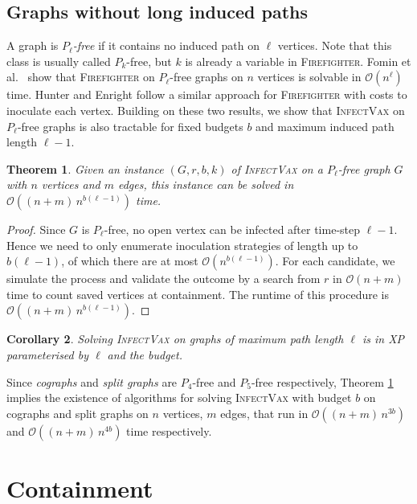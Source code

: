 \documentclass[unknownkeysallowed]{article}
\newtheorem{theorem}{Theorem}[section]
\newtheorem{corollary}[theorem]{Corollary}
\theoremstyle{definition}\newtheorem{strategy}{Strategy}
\theoremstyle{definition}\newtheorem{notation}{Notation}[theorem]
\newcommand*{\Fire}{\textup{\textsc{Firefighter}}\xspace} %
\newcommand*{\IV}{\textup{\textsc{InfectVax}}\xspace}
\begin{document}
\subsection{Graphs without long induced paths}
\label{sec:bounded-path-length}

A graph is \emph{$P_\ell$-free} if it contains no induced path on $\ell$ vertices.  Note that this class is usually called $P_k$-free, but $k$ is already a variable in \Fire.  Fomin et al.\ \cite{fomin_2016} show that \Fire on $P_\ell$-free graphs on $n$ vertices is solvable in $\mathcal{O}(n^\ell)$ time. Hunter and Enright \cite{hunter_2024} follow a similar approach for \Fire with costs to inoculate each vertex. Building on these two results, we show that \IV on $P_\ell$-free graphs is also tractable for fixed budgets $b$ and maximum induced path length $\ell-1$.

\begin{theorem} 
Given an instance $(G,r,b,k)$ of \IV on a $P_{\ell}$-free graph $G$ with $n$ vertices and $m$ edges, this instance can be solved in $\mathcal{O}((n+m)\,n^{b(\ell-1)})$ time.
  \label{thm:iv-pk-free}
\end{theorem}

\begin{proof}
Since $G$ is $P_\ell$-free, no open vertex can be infected after time-step $\ell-1$. Hence we need to only enumerate inoculation strategies of length up to $b(\ell-1)$, of which there are at most $\mathcal{O}(n^{b(\ell-1)})$. For each candidate, we simulate the process and validate the outcome by a search from $r$ in $\mathcal{O}(n+m)$ time to count saved vertices at containment. The runtime of this procedure is $\mathcal{O}((n+m)\,n^{b(\ell-1)})$.
\end{proof}

\begin{corollary}\label{cor:bounded-poly}
  Solving \IV on graphs of maximum path length $\ell$ is in XP parameterised by $\ell$ and the budget.
\end{corollary}

Since \emph{cographs} and \emph{split graphs} are $P_4$-free and $P_5$-free respectively, Theorem \ref{thm:iv-pk-free} implies the existence of algorithms for solving \IV with budget $b$ on cographs and split graphs on $n$ vertices, $m$ edges, that run in $\mathcal{O}((n+m)\,n^{3b})$ and $\mathcal{O}((n+m)\,n^{4b})$ time respectively.


\section{Containment}
\label{sec:contain}
\end{document}
